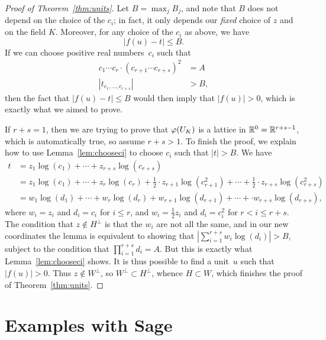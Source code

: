 \begin{proof}[Proof of Theorem~\ref{thm:units}]
Let $B=\max_{j} B_j$, and note that $B$ does not depend on the choice
of the $c_i$; in fact, it only depends our {\em fixed} choice of $z$ and on the field $K$.
Moreover, for any choice of the $c_i$ as above, we have
$$
  |f(u) - t| \leq B.
$$
If we can choose positive real numbers~$c_i$ such that
\begin{align*}
 c_1\cdots c_r\cdot (c_{r+1}\cdots c_{r+s})^2 &= A\\
  |t_{c_1,\ldots, c_{r+s}}| &>B,
\end{align*}
then the fact that $|f(u)-t|\leq B$ would then imply that $|f(u)|>0$,
which is exactly what we aimed to prove.

If $r+s=1$, then we are trying to prove that $\varphi(U_K)$ is a lattice
in $\mathbb{R}^0=\mathbb{R}^{r+s-1}$, which is automatically true, so assume $r+s>1$.
To finish the proof, we explain how to use Lemma~\ref{lem:chooseci}
to choose $c_i$ such that $|t|>B$.  We have
\begin{align*}
t &= z_1\log(c_1)+\cdots +z_{r+s}\log(c_{r+s})\\
&= z_1\log(c_1)+\cdots +  z_r\log(c_r)+
\frac{1}{2}\cdot z_{r+1}\log(c_{r+1}^2) + 
\cdots + \frac{1}{2}\cdot z_{r+s}\log(c_{r+s}^2)\\
&=w_1\log(d_1)+\cdots +  w_r\log(d_r)+
w_{r+1}\log(d_{r+1}) + 
\cdots +\cdot w_{r+s}\log(d_{r+s}),
\end{align*}
where $w_i=z_i$ and $d_i=c_i$ for $i\leq r$, and
$w_i=\frac{1}{2}z_i$ and $d_i=c_i^2$ for $r<i\leq r+s$.
The condition that $z\not\in H^{\perp}$ is that the $w_i$ are not all
the same, 
 and in our new coordinates the lemma is equivalent to
showing that $|\sum_{i=1}^{r+s} w_i \log(d_i)|>B$, subject to the
condition that $\prod_{i=1}^{r+s} d_i = A$. 
But this is exactly what Lemma~\ref{lem:chooseci} shows.
It is thus possible
to find a unit~$u$ such that $|f(u)|>0$.  Thus $z\not\in
W^{\perp}$, so $W^{\perp}\subset H^{\perp}$, whence $H\subset W$,
which finishes the proof of Theorem~\ref{thm:units}.
\end{proof}

\section{Examples with Sage}
